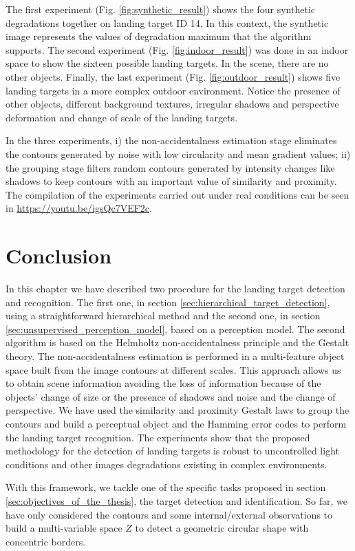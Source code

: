 The first experiment (Fig. \ref{fig:synthetic_result}) shows the four synthetic degradations together on landing target ID 14. In this context, the synthetic image represents the values of degradation maximum that the algorithm supports. The second experiment (Fig. \ref{fig:indoor_result}) was done in an indoor space to show the sixteen possible landing targets. In the scene, there are no other objects. Finally, the last experiment (Fig. \ref{fig:outdoor_result}) shows five landing targets in a more complex outdoor environment. Notice the presence of other objects, different background textures,  irregular shadows and perspective deformation and change of scale of the landing targets. 

In the three experiments, i) the non-accidentalness estimation stage eliminates the contours generated by noise with low circularity and mean gradient values; ii) the grouping stage filters random contours generated by intensity changes like shadows to keep contours with an important value of similarity and proximity. The compilation of the experiments carried out under real conditions can be seen in \url{https://youtu.be/igsQc7VEF2c}.

\section{Conclusion}\label{sec:conclusions_landing_target}
In this chapter we have described two procedure for the landing target detection and recognition. The first one, in section \ref{sec:hierarchical_target_detection}, using a straightforward hierarchical method and the second one, in section \ref{sec:unsupervised_perception_model}, based on a perception model. The second algorithm is based on the Helmholtz non-accidentalness principle and the Gestalt theory. The non-accidentalness estimation is performed in a multi-feature object space built from the image contours at different scales. This approach allows us to obtain scene information avoiding the loss of information because of the objects' change of size or the presence of shadows and noise and the change of perspective. We have used the similarity and proximity Gestalt laws to group the contours and build a perceptual object and the Hamming error codes to perform the landing target recognition. The experiments show that the proposed methodology for the detection of landing targets is robust to uncontrolled light conditions and other images degradations existing in complex environments.

With this framework, we tackle one of the specific tasks proposed in section \ref{sec:objectives_of_the_thesis}, the target detection and identification. So far, we have only considered the contours and some internal/external observations to build a multi-variable space $Z$ to detect a geometric circular shape with concentric borders. 

